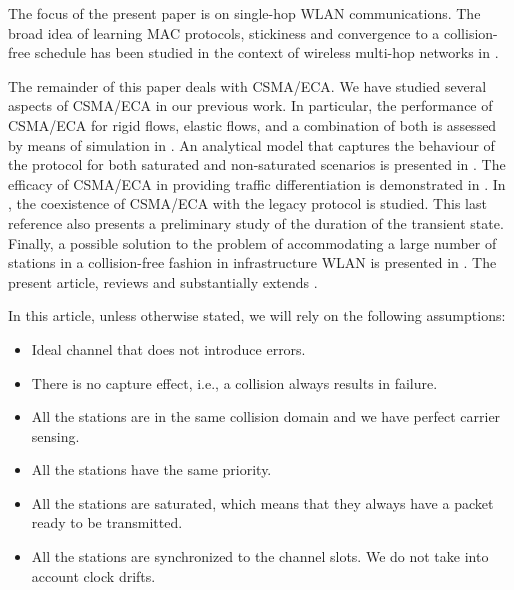 \documentclass[journal]{IEEEtran}
\begin{document}
The focus of the present paper is on single-hop WLAN communications. The broad idea of learning MAC protocols, stickiness and convergence to a collision-free schedule has been studied in the context of wireless multi-hop networks in \cite{yi2010msl,singh2007scc,lin1997amm}.

The remainder of this paper deals with CSMA/ECA. We have studied several aspects of CSMA/ECA in our previous work. In particular, the performance of CSMA/ECA for rigid flows, elastic flows, and a combination of both is assessed by means of simulation in \cite{bellalta2009vtc}. An analytical model that captures the behaviour of the protocol for both saturated and non-saturated scenarios is presented in \cite{barcelo2009cpa}. The efficacy of CSMA/ECA in providing traffic differentiation is demonstrated in \cite{barcelo2009tpc}. In \cite{barcelo2010fcc}, the coexistence of CSMA/ECA with the legacy protocol is studied. This last reference also presents a preliminary study of the duration of the transient state. Finally, a possible solution to the problem of accommodating a large number of stations in a collision-free fashion in infrastructure WLAN is presented in \cite{barcelo2010dpa}. The present article, reviews and substantially extends \cite{barcelo2010dpa}.

In this article, unless otherwise stated, we will rely on the following assumptions:
\begin{itemize}
\item Ideal channel that does not introduce errors.
\item There is no capture effect, i.e., a collision always results in failure.
\item All the stations are in the same collision domain and we have perfect carrier sensing.
\item All the stations have the same priority.
\item All the stations are saturated, which means that they always have a packet ready to be transmitted.
\item All the stations are synchronized to the channel slots. We do not take into account clock drifts.
\end{itemize}
\end{document}
